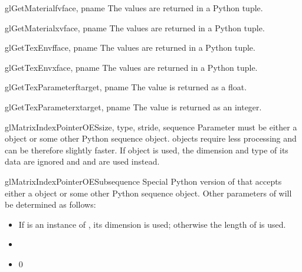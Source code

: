 \begin{funcdesc}{glGetMaterialfv}{face, pname}
The values are returned in a Python tuple.
\end{funcdesc}

\begin{funcdesc}{glGetMaterialxv}{face, pname}
The values are returned in a Python tuple.
\end{funcdesc}

\begin{funcdesc}{glGetTexEnvf}{face, pname}
The values are returned in a Python tuple.
\end{funcdesc}

\begin{funcdesc}{glGetTexEnvx}{face, pname}
The values are returned in a Python tuple.
\end{funcdesc}

\begin{funcdesc}{glGetTexParameterf}{target, pname}
The value is returned as a float.
\end{funcdesc}

\begin{funcdesc}{glGetTexParameterx}{target, pname}
The value is returned as an integer.
\end{funcdesc}

\begin{funcdesc}{glMatrixIndexPointerOES}{size, type, stride, sequence}
Parameter  must be either a  object or some other
Python sequence object.  objects require less processing and
can be therefore slightly faster. If  object is used, the
dimension and type of its data are ignored and  and  are
used instead.
\end{funcdesc}

\begin{funcdesc}{glMatrixIndexPointerOESub}{sequence}
Special Python version of  that accepts either a
 object or some other Python sequence object.
Other parameters of  will be determined as follows:
\begin{itemize}
\item {} If  is an instance of , its dimension is used; otherwise the length of  is used.
\item {} 
\item {} 0
\end{itemize}
\end{funcdesc}

